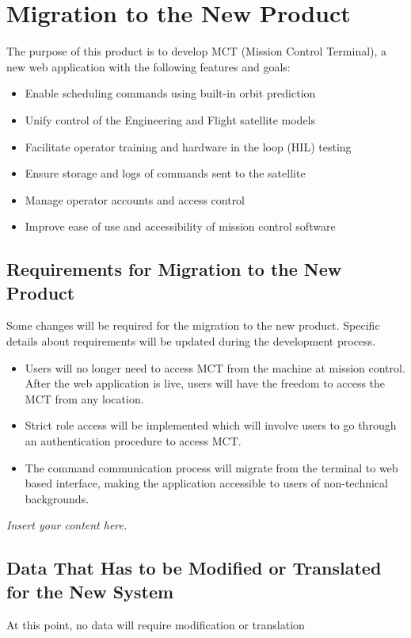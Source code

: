 \documentclass[12pt]{article}
\newcommand{\lips}{\textit{Insert your content here.}}
\begin{document}
\section{Migration to the New Product}
The purpose of this product is to develop MCT (Mission Control Terminal), a new web application with the following features and goals:
\begin{itemize}
    \item  Enable scheduling commands using built-in orbit prediction
    \item Unify control of the Engineering and Flight satellite models
    \item Facilitate operator training and hardware in the loop (HIL) testing
    \item Ensure storage and logs of commands sent to the satellite
    \item Manage operator accounts and access control
    \item Improve ease of use and accessibility of mission control software
\end{itemize}
\subsection{Requirements for Migration to the New Product}
Some changes will be required for the migration to the new product. Specific details about requirements will be updated during the development process.
\begin{itemize}
    \item Users will no longer need to access MCT from the machine at mission control. After the web application is live, users will have the freedom to access the MCT from any location.
    \item Strict role access will be implemented which will involve users to go through an authentication procedure to access MCT.
    \item The command communication process will migrate from the terminal to web based interface, making the application accessible to users of non-technical backgrounds.
 
\end{itemize}
\lips
\subsection{Data That Has to be Modified or Translated for the New System}
At this point, no data will require modification or translation
\end{document}
